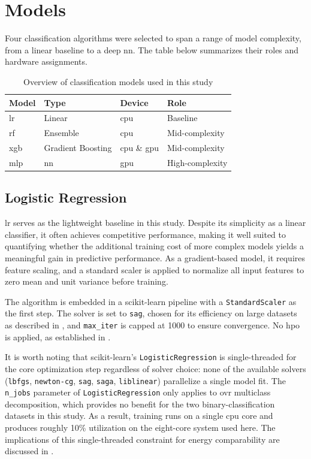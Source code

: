 \section{Models}
\label{implementation_models}

Four classification algorithms were selected to span a range of model complexity, from a linear baseline to a deep \gls{nn}. The table below summarizes their roles and hardware assignments.

\begin{table}[htbp]
\centering
\caption{Overview of classification models used in this study}
\label{tab:models}
\begin{tabular}{llll}
\toprule
\textbf{Model} & \textbf{Type} & \textbf{Device} & \textbf{Role} \\
\midrule
\gls{lr} & Linear & \gls{cpu} & Baseline \\
\gls{rf}  & Ensemble & \gls{cpu} & Mid-complexity \\
\gls{xgb} & Gradient Boosting & \gls{cpu} \& \gls{gpu} & Mid-complexity \\
\gls{mlp} & \gls{nn} & \gls{gpu} & High-complexity \\
\bottomrule
\end{tabular}
\end{table}

\subsection{Logistic Regression}
\label{implementation_lr}

\gls{lr} serves as the lightweight baseline in this study. Despite its simplicity as a linear classifier, it often achieves competitive performance, making it well suited to quantifying whether the additional training cost of more complex models yields a meaningful gain in predictive performance. As a gradient-based model, it requires feature scaling, and a standard scaler is applied to normalize all input features to zero mean and unit variance before training.

The algorithm is embedded in a scikit-learn pipeline with a \texttt{StandardScaler} as the first step. The solver is set to \texttt{sag}, chosen for its efficiency on large datasets as described in , and \texttt{max\_iter} is capped at 1000 to ensure convergence. No \gls{hpo} is applied, as established in .

It is worth noting that scikit-learn's \texttt{LogisticRegression} is single-threaded for the core optimization step regardless of solver choice: none of the available solvers (\texttt{lbfgs}, \texttt{newton-cg}, \texttt{sag}, \texttt{saga}, \texttt{liblinear}) parallelize a single model fit. The \texttt{n\_jobs} parameter of \texttt{LogisticRegression} only applies to \gls{ovr} multiclass decomposition, which provides no benefit for the two binary-classification datasets in this study. As a result, training runs on a single \gls{cpu} core and produces roughly 10\% utilization on the eight-core system used here. The implications of this single-threaded constraint for energy comparability are discussed in .

